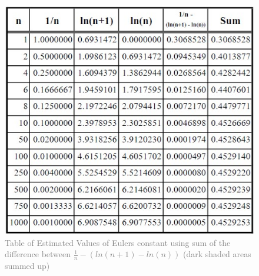 \documentclass{article}
\begin{document}
\begin{figure}[htp]
    \centering
    \includegraphics[scale=0.65]{table2 of euler gamma .jpg}
    \caption{\textcolor{gray}{Table of Estimated Values of Eulers constant using sum of the difference between $\frac{1}{n}-(ln(n+1)-ln(n))$ (dark shaded areas summed up)}}
\end{figure}
\end{document}
